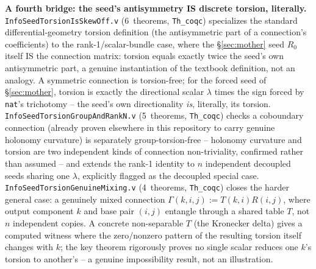 \documentclass[10pt,twocolumn]{article}
\begin{document}
\textbf{A fourth bridge: the seed's antisymmetry IS discrete torsion, literally.}
\texttt{InfoSeedTorsionIsSkewOff.v} (6~theorems, \texttt{Th\_coqc}) specializes the standard
differential-geometry torsion definition (the antisymmetric part of a connection's
coefficients) to the rank-1/scalar-bundle case, where the \S\ref{sec:mother} seed $R_0$ itself
IS the connection matrix: torsion equals exactly twice the seed's own antisymmetric part, a
genuine instantiation of the textbook definition, not an analogy. A symmetric connection is
torsion-free; for the forced seed of \S\ref{sec:mother}, torsion is exactly the directional
scalar $\lambda$ times the sign forced by \texttt{nat}'s trichotomy -- the seed's own
directionality \emph{is}, literally, its torsion. \texttt{InfoSeedTorsionGroupAndRankN.v}
(5~theorems, \texttt{Th\_coqc}) checks a coboundary connection (already proven elsewhere in this
repository to carry genuine holonomy curvature) is separately group-torsion-free -- holonomy
curvature and torsion are two independent kinds of connection non-triviality, confirmed rather
than assumed -- and extends the rank-1 identity to $n$ independent decoupled seeds sharing one
$\lambda$, explicitly flagged as the decoupled special case. \texttt{InfoSeedTorsionGenuineMixing.v}
(4~theorems, \texttt{Th\_coqc}) closes the harder general case: a genuinely mixed connection
$\Gamma(k,i,j) := T(k,i)R(i,j)$, where output component $k$ and base pair $(i,j)$ entangle
through a shared table $T$, not $n$ independent copies. A concrete non-separable $T$ (the
Kronecker delta) gives a computed witness where the zero/nonzero pattern of the resulting torsion
itself changes with $k$; the key theorem rigorously proves no single scalar reduces one $k$'s
torsion to another's -- a genuine impossibility result, not an illustration.
\end{document}
